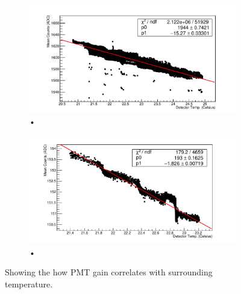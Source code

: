 \begin{figure}
\centering
\begin{subfigure}[b]{\textwidth}
\includegraphics[width=\textwidth]{chapters/graphs/PMTchar/PMT900V_temperatureVsADC.pdf}
\caption{•}
\end{subfigure}
\begin{subfigure}[b]{\textwidth}
\includegraphics[width=\textwidth]{chapters/graphs/PMTchar/PMT600V_temperatureVsADC.pdf}
\caption{•}
\end{subfigure}
\caption{Showing the how PMT gain correlates with surrounding temperature.}
\end{figure}

